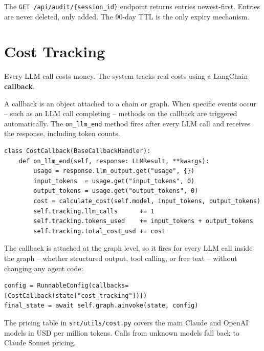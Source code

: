 \documentclass[12pt,a4paper]{article}
\begin{document}
The \texttt{GET /api/audit/\{session\_id\}} endpoint returns entries newest-first. Entries are never deleted, only added. The 90-day TTL is the only expiry mechanism.


\section{Cost Tracking}

Every LLM call costs money. The system tracks real costs using a LangChain \textbf{callback}.

A callback is an object attached to a chain or graph. When specific events occur -- such as an LLM call completing -- methods on the callback are triggered automatically. The \texttt{on\_llm\_end} method fires after every LLM call and receives the response, including token counts.

\begin{lstlisting}[caption={CostCallback accumulates cost across all LLM calls in the graph}]
class CostCallback(BaseCallbackHandler):
    def on_llm_end(self, response: LLMResult, **kwargs):
        usage = response.llm_output.get("usage", {})
        input_tokens  = usage.get("input_tokens", 0)
        output_tokens = usage.get("output_tokens", 0)
        cost = calculate_cost(self.model, input_tokens, output_tokens)
        self.tracking.llm_calls      += 1
        self.tracking.tokens_used    += input_tokens + output_tokens
        self.tracking.total_cost_usd += cost
\end{lstlisting}

The callback is attached at the graph level, so it fires for every LLM call inside the graph -- whether structured output, tool calling, or free text -- without changing any agent code:

\begin{lstlisting}[caption={Attaching the callback when the graph runs}]
config = RunnableConfig(callbacks=[CostCallback(state["cost_tracking"])])
final_state = await self.graph.ainvoke(state, config)
\end{lstlisting}

The pricing table in \texttt{src/utils/cost.py} covers the main Claude and OpenAI models in USD per million tokens. Calls from unknown models fall back to Claude Sonnet pricing.


\end{document}
